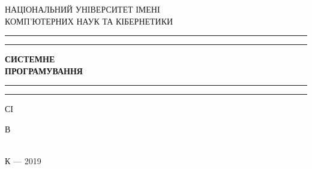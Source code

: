 \documentclass[a4paper, 12pt, oneside]{book}
\begin{document}
\begin{titlepage} %

	\centering
	
	{ НАЦІОНАЛЬНИЙ УНІВЕРСИТЕТ ІМЕНІ   \\  КОМП'ЮТЕРНИХ НАУК ТА КІБЕРНЕТИКИ}
	
	\vfill
	
	\rule{\textwidth}{1.6pt}\vspace*{-\baselineskip}\vspace*{2pt} %
	\rule{\textwidth}{0.4pt} %
	
	\vspace{0.75\baselineskip}
	
	{\huge \bfseries СИСТЕМНЕ\\ ПРОГРАМУВАННЯ\\}
	
	\vspace{0.75\baselineskip}
	
	\rule{\textwidth}{0.4pt}\vspace*{-\baselineskip}\vspace{3.2pt} %
	\rule{\textwidth}{1.6pt} %
	
	\vspace{\baselineskip}
	
	{С І   }
	
	\vfill
	
	{ \Large В \\   \\}
	
	\vfill
	
	\vfill
	
	{К{\normalsize} --- 2019}

\end{titlepage}
\end{document}
